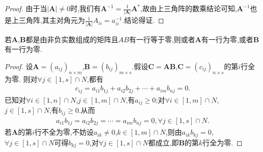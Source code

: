 \documentclass[../../main.tex]{subfiles}%
\begin{document}
\begin{proof}
由于当$\left| \boldsymbol{A} \right|\ne 0$时,我们有$\boldsymbol{A}^{-1}=\frac{1}{\left| \boldsymbol{A} \right|}\boldsymbol{A}^*$,故由上三角阵的数乘结论可知,$\boldsymbol{A}^{-1}$也是上三角阵,其主对角元为$\frac{1}{\left| \boldsymbol{A} \right|}A_{ii}=a_{ii}^{-1}$.结论得证.
\end{proof}

\begin{proposition}
若\(\boldsymbol{A}\),\(\boldsymbol{B}\)都是由非负实数组成的矩阵且\(AB\)有一行等于零,则或者\(\boldsymbol{A}\)有一行为零,或者\(\boldsymbol{B}\)有一行为零.
\end{proposition}
\begin{proof}
设\(\boldsymbol{A} = (a_{ij})_{n\times m}\),\(\boldsymbol{B} = (b_{ij})_{m\times s}\).假设\(\boldsymbol{C} = \boldsymbol{AB}\),\(\boldsymbol{C} = (c_{ij})_{n\times s}\)的第\(i\)行全为零.
则对\(\forall j\in [1,s]\cap N\),都有
\begin{align*}
c_{ij} = a_{i1}b_{1j} + a_{i2}b_{2j} + \cdots + a_{im}b_{nj} = 0 .
\end{align*}
已知对\(\forall i\in [1,n]\cap N\),\(j\in [1,m]\cap N\),有\(a_{ij} \geqslant  0\);对\(\forall i\in [1,m]\cap N\),\(j\in [1,s]\cap N\),有\(b_{ij} \geqslant  0\).从而
\begin{align*}
a_{i1}b_{1j} = a_{i2}b_{2j} = \cdots = a_{im}b_{nj} = 0,\forall j\in [1,s]\cap N.
\end{align*}
若\(\boldsymbol{A}\)的第\(i\)行不全为零,不妨设\(a_{ik} \neq 0\),\(k\in [1,m]\cap N\),则由\(a_{ik}b_{kj} = 0\),\(\forall j\in [1,s]\cap N\)可得\(b_{kj} = 0\),对\(\forall j\in [1,s]\cap N\)都成立,即\(\boldsymbol{B}\)的第\(k\)行全为零. 
\end{proof}
\end{document}
